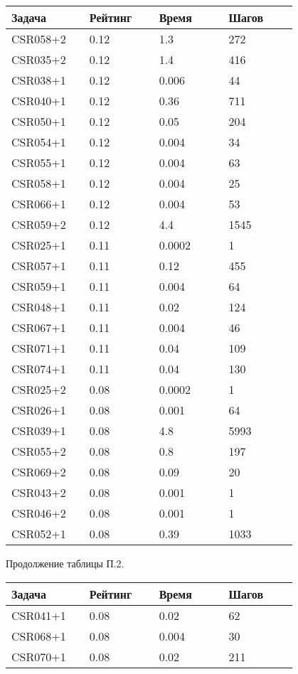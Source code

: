 \begin{longtable}[H]{|p{0.2\linewidth}|p{0.2\linewidth}|p{0.2\linewidth}|p{0.2\linewidth}|}
\hline
\textbf{Задача} & \textbf{Рейтинг} & \textbf{Время} & \textbf{Шагов} \\
\hline
CSR058+2 &  0.12 &  1.3 &  272 \\
\hline
CSR035+2 &  0.12 &  1.4 &  416 \\
\hline
CSR038+1 &  0.12 &  0.006 &  44 \\
\hline
CSR040+1 &  0.12 &  0.36 &  711 \\
\hline
CSR050+1 &  0.12 &  0.05 &  204 \\
\hline
CSR054+1 &  0.12 &  0.004 &  34 \\
\hline
CSR055+1 &  0.12 &  0.004 &  63 \\
\hline
CSR058+1 &  0.12 &  0.004 &  25 \\
\hline
CSR066+1 &  0.12 &  0.004 &  53 \\
\hline
CSR059+2 &  0.12 &  4.4 &  1545 \\
\hline
CSR025+1 &  0.11 &  0.0002 &  1 \\
\hline
CSR057+1 &  0.11 &  0.12 &  455 \\
\hline
CSR059+1 &  0.11 &  0.004 &  64 \\
\hline
CSR048+1 &  0.11 &  0.02 &  124 \\
\hline
CSR067+1 &  0.11 &  0.004 &  46 \\
\hline
CSR071+1 &  0.11 &  0.04 &  109 \\
\hline
CSR074+1 &  0.11 &  0.04 &  130 \\
\hline
CSR025+2 &  0.08 &  0.0002 &  1 \\
\hline
CSR026+1 &  0.08 &  0.001 &  64 \\
\hline
CSR039+1 &  0.08 &  4.8 &  5993 \\
\hline
CSR055+2 &  0.08 &  0.8 &  197 \\
\hline
CSR069+2 &  0.08 &  0.09 &  20 \\
\hline
CSR043+2 &  0.08  &  0.001 &  1 \\
\hline
CSR046+2 &  0.08 &  0.001 &  1 \\
\hline
CSR052+1 &  0.08 &  0.39 &  1033 \\
\hline
\end{longtable}
\begin{center}
Продолжение таблицы П.2.
\end{center}

\begin{longtable}[H]{|p{0.2\linewidth}|p{0.2\linewidth}|p{0.2\linewidth}|p{0.2\linewidth}|}
\hline
\textbf{Задача} & \textbf{Рейтинг} & \textbf{Время} & \textbf{Шагов} \\
\hline
CSR041+1 &  0.08 &  0.02 &  62 \\
\hline
CSR068+1 &  0.08 &  0.004 &  30 \\
\hline
CSR070+1 &  0.08 &  0.02 &  211 \\
\hline
\end{longtable}


